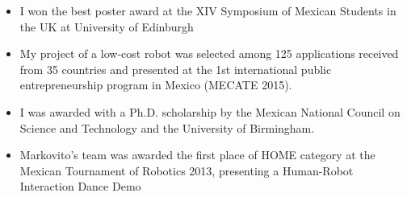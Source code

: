 \documentclass{mycv}
\begin{document}
\begin{itemize}
\item I won the best poster award at the XIV Symposium of Mexican Students in the UK at University of Edinburgh \href{https://github.com/mxochicale/symposiummx/tree/master/2016}{\faExternalLink*}  

\item My project of a low-cost robot was selected among 125 applications received from 35 countries and presented at the 1st international public entrepreneurship program in Mexico (MECATE 2015). \href{http://let-emprendimientopublico.mx/en/portfolio_category/mecate-primera-generacion-en/}{\faExternalLink*} \href{https://www.youtube.com/watch?v=VjVGnwD422g}{\faYoutube} 

\item I was awarded with a Ph.D. scholarship by the Mexican National Council on Science and Technology and the University of Birmingham. 

\item 

Markovito's team was awarded the first place of HOME category at the Mexican Tournament of Robotics 2013, presenting a Human-Robot Interaction Dance Demo \href{https://www.youtube.com/watch?v=Kw-lZam_qZI}{\faYoutube} 

\end{itemize}

\end{document}
